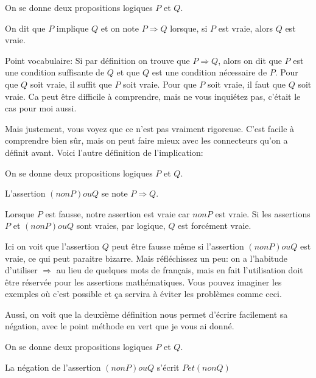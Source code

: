 \documentclass{article}
\begin{document}
 \begin{tcolorbox}[colback=red!5!white,colframe=red!75!black,title=Définition 1.8.1]

On se donne deux propositions logiques $P$ et $Q$. 

On dit que $P$ implique $Q$ et on note $P \Rightarrow Q$ lorsque, si $P$ est vraie, alors $Q$ est vraie.


\end{tcolorbox}

Point vocabulaire: Si par définition on trouve que $P \Rightarrow Q$, alors on dit que $P$ est une condition suﬃsante de $Q$ et que $Q$ est une condition
nécessaire de $P$. Pour que $Q$ soit vraie, il suﬃt que $P$ soit vraie. Pour que $P$ soit vraie, il faut que $Q$ soit vraie. Ca peut être difficile à comprendre, mais ne vous inquiétez pas, c'était le cas pour moi aussi.

Mais justement, vous voyez que ce n'est pas vraiment rigoreuse. C'est facile à comprendre bien sûr, mais on peut faire mieux avec les connecteurs qu'on a définit avant. Voici l'autre définition de l'implication:

 \begin{tcolorbox}[colback=red!5!white,colframe=red!75!black,title=Définition 1.8.2]

On se donne deux propositions logiques $P$ et $Q$. 

L'assertion $(nonP) ou Q$ se note $P \Rightarrow Q$.


\end{tcolorbox}

Lorsque $P$ est fausse, notre assertion est vraie car $nonP$ est vraie. Si les assertions $P$ et $(nonP) ou Q$ sont vraies, par logique, $Q$ est forcément vraie.

Ici on voit que l'assertion $Q$ peut être fausse même si l'assertion $(nonP) ou Q$ est vraie, ce qui peut paraitre bizarre. Mais réfléchissez un peu: on a l'habitude d'utiliser $\Rightarrow$ au lieu de quelques mots de fran\c cais, mais en fait l'utilisation doit être réservée pour les assertions mathématiques. Vous pouvez imaginer les exemples où c'est possible et \c ca servira à éviter les problèmes comme ceci.

Aussi, on voit que la deuxième définition nous permet d'écrire facilement sa négation, avec le point méthode en vert que je vous ai donné.

 \begin{tcolorbox}[colback=blue!5!white,colframe=blue!75!black,title=Propriété 1.1]

On se donne deux propositions logiques $P$ et $Q$. 

La négation de l'assertion $(nonP) ou Q$ s'écrit $P et (nonQ)$


\end{tcolorbox}
\end{document}
